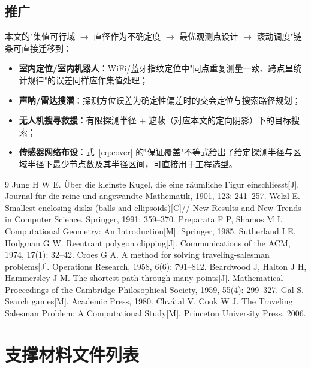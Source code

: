 \subsection{推广}

本文的"集值可行域 $\to$ 直径作为不确定度 $\to$ 最优观测点设计 $\to$ 滚动调度"链条可直接迁移到：

\begin{itemize}
  \item \textbf{室内定位/室内机器人}：WiFi/蓝牙指纹定位中"同点重复测量一致、跨点呈统计规律"的误差同样应作集值处理；
  \item \textbf{声呐/雷达搜潜}：探测方位误差为确定性偏差时的交会定位与搜索路径规划；
  \item \textbf{无人机搜寻救援}：有限探测半径 $+$ 遮蔽（对应本文的定向阴影）下的目标搜索；
  \item \textbf{传感器网络布设}：式~\eqref{eq:cover} 的"保证覆盖"不等式给出了给定探测半径与区域半径下最少节点数及其半径区间，可直接用于工程选型。
\end{itemize}

\begin{thebibliography}{9}
 Jung H W E. Über die kleinste Kugel, die eine räumliche Figur einschliesst[J]. Journal für die reine und angewandte Mathematik, 1901, 123: 241--257.
 Welzl E. Smallest enclosing disks (balls and ellipsoids)[C]// New Results and New Trends in Computer Science. Springer, 1991: 359--370.
 Preparata F P, Shamos M I. Computational Geometry: An Introduction[M]. Springer, 1985.
 Sutherland I E, Hodgman G W. Reentrant polygon clipping[J]. Communications of the ACM, 1974, 17(1): 32--42.
 Croes G A. A method for solving traveling-salesman problems[J]. Operations Research, 1958, 6(6): 791--812.
 Beardwood J, Halton J H, Hammersley J M. The shortest path through many points[J]. Mathematical Proceedings of the Cambridge Philosophical Society, 1959, 55(4): 299--327.
 Gal S. Search games[M]. Academic Press, 1980.
 Chvátal V, Cook W J. The Traveling Salesman Problem: A Computational Study[M]. Princeton University Press, 2006.
\end{thebibliography}

\newpage
\appendix

\section{支撑材料文件列表}

